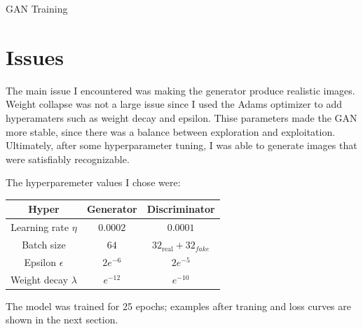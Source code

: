 \documentclass{genai}
\begin{document}
\begin{algorithm}[h]
    \caption{GAN Training}
    \begin{algorithmic}[1]
        \EndProcedure
		\EndProcedure
				\EndFor
			\EndFor
		\EndProcedure
    \end{algorithmic}
\end{algorithm}

\section{Issues}

The main issue I encountered was making the generator produce realistic images.
Weight collapse was not a large issue since I used the Adams optimizer to add hyperamaters such as weight decay and epsilon.
Thise parameters made the GAN more stable, since there was a balance between exploration and exploitation.
Ultimately, after some hyperparameter tuning, I was able to generate images that were satisfiably recognizable.

The hyperparemeter values I chose were:
\begin{center}
	\begin{tabular}{c|c|c}
		\textbf{Hyper} & \textbf{Generator} & \textbf{Discriminator} \\
		\hline
		Learning rate $\eta$ & $0.0002$ & $0.0001$\\
		Batch size & $64$ & $32_\text{real}+32_{fake}$\\
		Epsilon $\epsilon$ & $2e^{-6}$ & $2e^{-5}$\\
		Weight decay $\lambda$ & $e^{-12}$ & $e^{-10}$
	\end{tabular}
\end{center}
The model was trained for 25 epochs; examples after traning and loss curves are shown in the next section.
\end{document}
